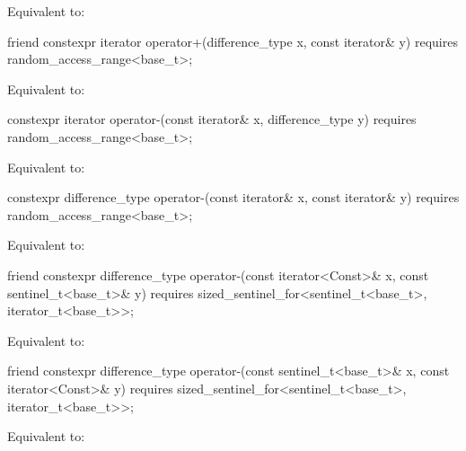 \begin{itemdescr}
\pnum
\effects
Equivalent to: 
\end{itemdescr}

%
\begin{itemdecl}
friend constexpr iterator operator+(difference_type x, const iterator& y)
  requires random_access_range<base_t>;
\end{itemdecl}

\begin{itemdescr}
\pnum
\effects
Equivalent to: 
\end{itemdescr}

%
\begin{itemdecl}
constexpr iterator operator-(const iterator& x, difference_type y)
  requires random_access_range<base_t>;
\end{itemdecl}

\begin{itemdescr}
\pnum
\effects
Equivalent to: 
\end{itemdescr}

%
\begin{itemdecl}
constexpr difference_type operator-(const iterator& x, const iterator& y)
  requires random_access_range<base_t>;
\end{itemdecl}

\begin{itemdescr}
\pnum
\effects
Equivalent to: 
\end{itemdescr}

%
\begin{itemdecl}
friend constexpr difference_type
  operator-(const iterator<Const>& x, const sentinel_t<base_t>& y)
    requires sized_sentinel_for<sentinel_t<base_t>, iterator_t<base_t>>;
\end{itemdecl}

\begin{itemdescr}
\pnum
\effects
Equivalent to: 
\end{itemdescr}

%
\begin{itemdecl}
friend constexpr difference_type
  operator-(const sentinel_t<base_t>& x, const iterator<Const>& y)
    requires sized_sentinel_for<sentinel_t<base_t>, iterator_t<base_t>>;
\end{itemdecl}

\begin{itemdescr}
\pnum
\effects
Equivalent to: 
\end{itemdescr}
